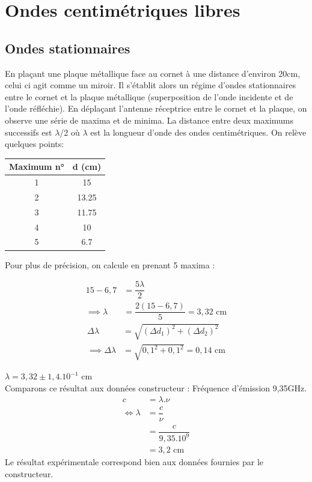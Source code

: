 \documentclass[12pt,a4paper]{article}
\begin{document}
\section{Ondes centimétriques libres}
\subsection{Ondes stationnaires}
En plaçant une plaque métallique face au cornet à une distance d'environ 20cm, celui ci agit comme un miroir. Il s'établit alors un régime d'ondes stationnaires entre le cornet et la plaque métallique (superposition de l'onde incidente et de l'onde réfléchie). En déplaçant l'antenne réceptrice entre le cornet et la plaque, on observe une série de maxima et de minima. La distance entre deux maximums successifs est $\lambda$/2 où $\lambda$ est la longueur d'onde des ondes centimétriques. On relève quelques points:
\begin{center}
\begin{tabular}{|c|c|}
	\hline 
	Maximum n° & d (cm) \\ 
	\hline 
	1 & 15 \\ 
	\hline 
	2 & 13.25 \\ 
	\hline 
	3 & 11.75 \\ 
	\hline 
	4 & 10 \\ 
	\hline 
	5 & 6.7 \\ 
	\hline 
\end{tabular} 
\end{center}
Pour plus de précision, on calcule en prenant 5 maxima : 
\setlength\columnseprule{0.5pt}
\begin{multicols}{2}
\begin{align*}
15-6,7 &= \dfrac{5\lambda}{2}\\
\implies \lambda &= \dfrac{2(15-6,7)}{5}=3,32 \text{ cm}
\end{align*}
\vfill
\columnbreak
\begin{align*}
\Delta \lambda &= \sqrt {\left( \Delta d_{1}\right) ^{2}+\left( \Delta d_{2}\right) ^{2}}\\
\implies \Delta \lambda &= \sqrt {0,1^2+0,1^2}=0,14 \text{ cm}
\end{align*}
\end{multicols}
$\lambda = 3,32\pm1,4.10^{-1}$ cm\\
Comparons ce résultat aux données constructeur : Fréquence d'émission 9,35GHz.
\begin{align*}
c &= \lambda.\nu\\
\iff \lambda &= \dfrac{c}{\nu}\\
&=\dfrac{c}{9,35.10^9}\\
&=3,2 \text{ cm}
\end{align*}
Le résultat expérimentale correspond bien aux données fournies par le constructeur. 
\end{document}
